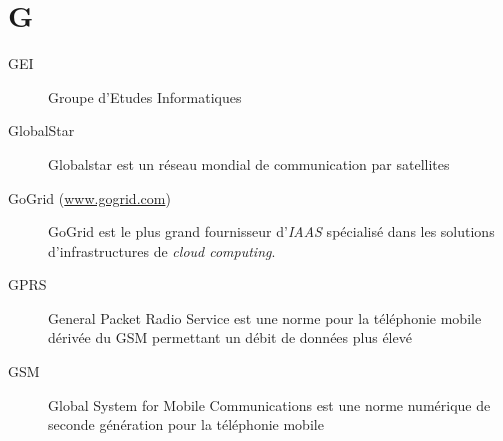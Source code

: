 \section{G}

\begin{description}

\item[GEI] Groupe d'Etudes Informatiques

\item[GlobalStar] Globalstar est un réseau mondial de communication par satellites

\item[GoGrid (\url{www.gogrid.com})]
GoGrid est le plus grand fournisseur d'\textsl{IAAS} spécialisé dans les solutions
d'infrastructures de \textsl{cloud computing}.

\item[GPRS] General Packet Radio Service est une norme pour la téléphonie mobile dérivée du GSM permettant un débit de données plus élevé

\item[GSM] Global System for Mobile Communications est une norme numérique de seconde génération pour la téléphonie mobile

\end{description}
